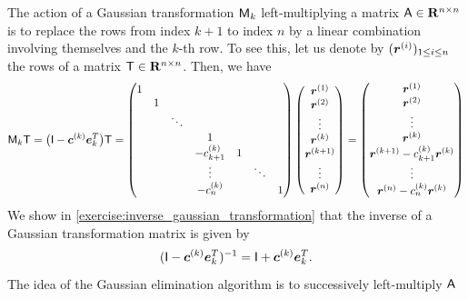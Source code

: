 The action of a Gaussian transformation $\mathsf M_k$ left-multiplying a matrix $\mathsf A \in \mathbf R^{n \times n}$ is
to replace the rows from index $k + 1$ to index $n$ by a linear combination involving themselves and the $k$-th row.
To see this, let us denote by $(\mathbf{\boldsymbol{r}}^{(i)})_{1 \leq i \leq n}$ the rows of a matrix $\mathsf T \in \mathbf R^{n \times n}$.
Then, we have
\[
    \mathsf M_k \mathsf T
    = \bigl(\mathsf I - \mathbf{\boldsymbol{c}}^{(k)} \mathbf{\boldsymbol{e}}_k^T\bigr) \mathsf T
    =
    \begin{pmatrix}
        1   \\
      & 1  \\
         & &  \ddots \\
        & & & 1 & & & \\
        & & & - c^{(k)}_{k+1} & 1  \\
        & & & \vdots & & \ddots \\
        & & & - c^{(k)}_n & & & 1 \\
    \end{pmatrix}
    \begin{pmatrix}
        \mathbf{\boldsymbol{r}}^{(1)} \\
        \mathbf{\boldsymbol{r}}^{(2)} \\
        \vdots \\
        \mathbf{\boldsymbol{r}}^{(k)} \\
        \mathbf{\boldsymbol{r}}^{(k+1)} \\
        \vdots \\
        \mathbf{\boldsymbol{r}}^{(n)}
    \end{pmatrix}
    =
    \begin{pmatrix}
        \mathbf{\boldsymbol{r}}^{(1)} \\
        \mathbf{\boldsymbol{r}}^{(2)} \\
        \vdots \\
        \mathbf{\boldsymbol{r}}^{(k)} \\
        \mathbf{\boldsymbol{r}}^{(k+1)} - c^{(k)}_{k+1} \mathbf{\boldsymbol{r}}^{(k)} \\
        \vdots \\
        \mathbf{\boldsymbol{r}}^{(n)} - c^{(k)}_{n} \mathbf{\boldsymbol{r}}^{(k)}
    \end{pmatrix}
\]
We show in \cref{exercise:inverse_gaussian_transformation} that
the inverse of a Gaussian transformation matrix is given by
\begin{equation}
    \label{eq:inverse_gaussian_transformation}
    (\mathsf I - \mathbf{\boldsymbol{c}}^{(k)} \mathbf{\boldsymbol{e}}_k^T)^{-1} = \mathsf I + \mathbf{\boldsymbol{c}}^{(k)} \mathbf{\boldsymbol{e}}_k^T.
\end{equation}
The idea of the Gaussian elimination algorithm is to successively left-multiply $\mathsf A$
